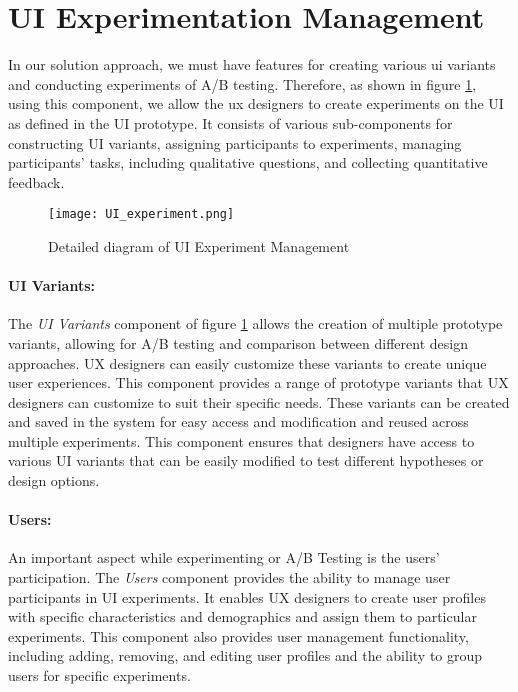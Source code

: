 \clearpage
\section{UI Experimentation Management}
\label{sc:section:experimentation}
In our solution approach, we must have features for creating various \ac{ui} variants and conducting experiments of A/B testing. 
Therefore, as shown in figure \ref{fig:sc:experiments}, using this component, we allow the \ac{ux} designers to create experiments on the UI as defined in the UI prototype.
It consists of various sub-components for constructing UI variants, assigning participants to experiments, managing participants' tasks, including qualitative questions, and collecting quantitative feedback.

\begin{figure}[htbp!]
    \centering    
    \texttt{[image: UI\_experiment.png]} 
    \caption[Details of UI Experiment Management]{Detailed diagram of UI Experiment Management}
    \label{fig:sc:experiments}
\end{figure}

\paragraph{UI Variants:}
The \textit{UI Variants} component of figure \ref{fig:sc:experiments} allows the creation of multiple prototype variants, allowing for A/B testing and comparison between different design approaches. 
UX designers can easily customize these variants to create unique user experiences.
This component provides a range of prototype variants that UX designers can customize to suit their specific needs. 
These variants can be created and saved in the system for easy access and modification and reused across multiple experiments. 
This component ensures that designers have access to various UI variants that can be easily modified to test different hypotheses or design options.

\paragraph{Users:}
An important aspect while experimenting or A/B Testing is the users' participation. 
The \textit{Users} component provides the ability to manage user participants in UI experiments. 
It enables UX designers to create user profiles with specific characteristics and demographics and assign them to particular experiments. 
This component also provides user management functionality, including adding, removing, and editing user profiles and the ability to group users for specific experiments.


